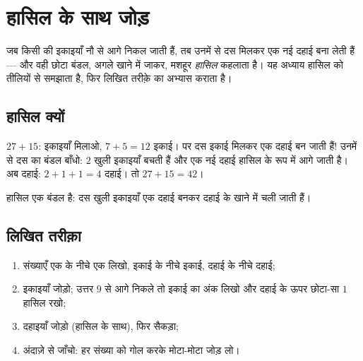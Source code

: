\chapter{हासिल के साथ जोड़}\label{ch:g2:addition}

जब किसी  की इकाइयाँ नौ से आगे निकल जाती हैं, तब उनमें से
दस मिलकर एक नई दहाई बना लेती हैं --- और वही छोटा बंडल, अगले
खाने में जाकर, मशहूर \emph{हासिल} कहलाता है। यह अध्याय हासिल को
तीलियों से समझाता है, फिर लिखित तरीक़े का अभ्यास कराता है।

\section{हासिल क्यों}

\begin{example}[दस इकाइयों का बंडल]\label{ex:g2:addition:bundle}
$27 + 15$: इकाइयाँ मिलाओ, $7 + 5 = 12$ इकाई। पर दस इकाई मिलकर
एक दहाई बन जाती हैं! उनमें से दस का बंडल बाँधो: $2$ खुली इकाइयाँ
बचती हैं और एक नई दहाई हासिल के रूप में आगे जाती है। अब दहाई:
$2 + 1 + 1 = 4$ दहाई। तो $27 + 15 = 42$।
\end{example}

\begin{omfigure}

{\small हासिल एक बंडल है: दस खुली इकाइयाँ एक दहाई बनकर दहाई के
खाने में चली जाती हैं।}
\end{omfigure}

\section{लिखित तरीक़ा}

\begin{method}[खानों में जोड़]\label{met:g2:addition:column}
\begin{enumerate}
  \item संख्याएँ एक के नीचे एक लिखो, इकाई के नीचे इकाई, दहाई
        के नीचे दहाई;
  \item इकाइयाँ जोड़ो; उत्तर $9$ से आगे निकले तो इकाई का अंक
        लिखो और दहाई के ऊपर छोटा-सा $1$ हासिल रखो;
  \item दहाइयाँ जोड़ो (हासिल के साथ), फिर सैकड़ा;
  \item अंदाज़े से जाँचो: हर संख्या को गोल करके मोटा-मोटा जोड़ लो।
\end{enumerate}
\end{method}


